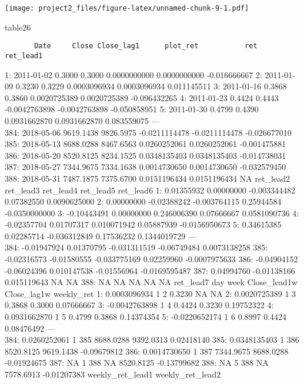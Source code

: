 \documentclass[
]{article}
\newenvironment{Shaded}{\begin{snugshade}}{\end{snugshade}}
\newcommand{\NormalTok}[1]{#1}
\begin{document}
\texttt{[image: project2\_files/figure-latex/unnamed-chunk-9-1.pdf]}

\begin{Shaded}
\begin{Highlighting}[]
\NormalTok{table26}
\end{Highlighting}
\end{Shaded}

\begin{verbatim}
       Date     Close Close_lag1      plot_ret           ret    ret_lead1
\end{verbatim}

1: 2011-01-02 0.3000 0.3000 0.0000000000 0.0000000000 -0.016666667 2:
2011-01-09 0.3230 0.3229 0.0003096934 0.0003096934 0.011145511 3:
2011-01-16 0.3868 0.3860 0.0020725389 0.0020725389 -0.096432265 4:
2011-01-23 0.4424 0.4443 -0.0042763898 -0.0042763898 -0.050858951 5:
2011-01-30 0.4799 0.4390 0.0931662870 0.0931662870 0.083559075 ---\\
384: 2018-05-06 9619.1438 9826.5975 -0.0211114478 -0.0211114478
-0.026677010 385: 2018-05-13 8688.0288 8467.6563 0.0260252061
0.0260252061 -0.001475881 386: 2018-05-20 8520.8125 8234.1525
0.0348135403 0.0348135403 -0.014738031 387: 2018-05-27 7344.9675
7334.1638 0.0014730650 0.0014730650 -0.032579450 388: 2018-05-31
7487.1875 7375.6700 0.0151196434 0.0151196434 NA ret\_lead2 ret\_lead3
ret\_lead4 ret\_lead5 ret\_lead6 1: 0.01355932 0.00000000 -0.003344482
0.07382550 0.0090625000 2: 0.00000000 -0.02388242 -0.003764115
0.25944584 -0.0350000000 3: -0.10443491 0.00000000 0.246006390
0.07666667 0.0581090736 4: -0.02357704 0.01707317 0.010071942 0.05887939
-0.0156950673 5: 0.34615385 0.02285714 -0.036312849 0.17536232
0.1344019729 ---\\
384: -0.01947924 0.01370795 -0.031311519 -0.06749484 0.0073138258 385:
-0.02316573 -0.01580555 -0.033775169 0.02259960 -0.0007975633 386:
-0.04904152 -0.06024396 0.010147538 -0.01556964 -0.0169595487 387:
0.04994760 -0.01138166 0.015119643 NA NA 388: NA NA NA NA NA ret\_lead7
day week Close\_lead1w Close\_lag1w weekly\_ret 1: 0.0003096934 1 2
0.3230 NA NA 2: 0.0020725389 1 3 0.3868 0.3000 0.07666667 3:
-0.0042763898 1 4 0.4424 0.3230 0.19752322 4: 0.0931662870 1 5 0.4799
0.3868 0.14374354 5: -0.0220652174 1 6 0.8997 0.4424 0.08476492 ---\\
384: 0.0260252061 1 385 8688.0288 9392.0313 0.02418140 385: 0.0348135403
1 386 8520.8125 9619.1438 -0.09679812 386: 0.0014730650 1 387 7344.9675
8688.0288 -0.01924675 387: NA 1 388 NA 8520.8125 -0.13799682 388: NA 5
388 NA 7578.6913 -0.01207383 weekly\_ret\_lead1 weekly\_ret\_lead2
\end{document}
